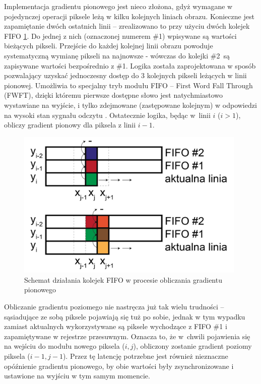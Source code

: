Implementacja gradientu pionowego jest nieco złożona, gdyż wymagane w pojedynczej operacji piksele leżą w kilku kolejnych liniach obrazu. 
Konieczne jest zapamiętanie dwóch ostatnich linii -- zrealizowano to przy użyciu dwóch kolejek FIFO \ref{fig:fifo_gradient}.
Do jednej z nich (oznaczonej numerem \#1) wpisywane są wartości bieżących pikseli.
Przejście do każdej kolejnej linii obrazu powoduje systematyczną wymianę pikseli na najnowsze - wówczas do kolejki \#2~są zapisywane wartości bezpośrednio z \#1.
Logika została zaprojektowana w sposób pozwalający uzyskać jednoczesny dostęp do 3 kolejnych pikseli leżących w linii pionowej. 
Umożliwia to specjalny tryb modułu FIFO -- First Word Fall Through (FWFT), dzięki któremu pierwsze dostępne słowo jest natychmiastowo wystawiane na wyjście, i tylko zdejmowane (zastępowane kolejnym) w odpowiedzi na wysoki stan sygnału odczytu \cite{FIFO}. %
Ostatecznie logika, będąc w~linii $i$ ($i>1$), obliczy gradient pionowy dla piksela z linii $i-1$. %
\begin{figure}[h]
	\centering
	\includegraphics[width=11cm]{4_fifo_gradient.jpg}
	\caption{Schemat działania kolejek FIFO w procesie obliczania gradientu pionowego}
	\label{fig:fifo_gradient}
\end{figure}

Obliczanie gradientu poziomego nie nastręcza już tak wielu trudności -- sąsiadujące ze sobą piksele pojawiają się tuż po sobie, jednak w tym wypadku zamiast aktualnych wykorzystywane są piksele wychodzące z FIFO \#1 i zapamiętywane w rejestrze przesuwnym. 
Oznacza to, że w~chwili pojawienia się na wejściu do modułu nowego piksela ($i,j$), obliczony zostanie gradient poziomy piksela ($i-1,j-1$). 
Przez tę latencję potrzebne jest również nieznaczne opóźnienie gradientu pionowego, by obie wartości były zsynchronizowane i ustawione na wyjściu w tym samym momencie.

